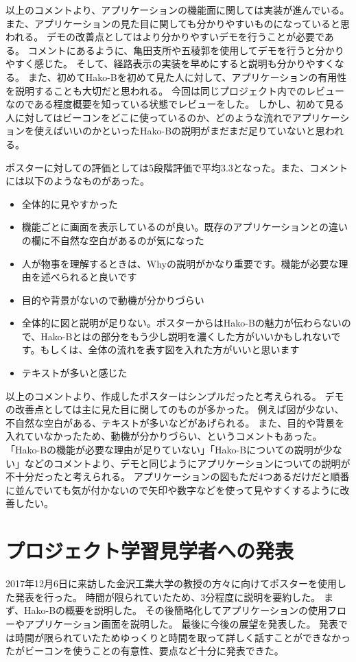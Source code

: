 \documentclass[openany,11pt,papersize]{jsbook}
\begin{document}
以上のコメントより、アプリケーションの機能面に関しては実装が進んでいる。
また、アプリケーションの見た目に関しても分かりやすいものになっていると思われる。
デモの改善点としてはより分かりやすいデモを行うことが必要である。
コメントにあるように、亀田支所や五稜郭を使用してデモを行うと分かりやすく感じた。
そして、経路表示の実装を早めにすると説明も分かりやすくなる。
また、初めてHako-Bを初めて見た人に対して、アプリケーションの有用性を説明することも大切だと思われる。
今回は同じプロジェクト内でのレビューなのである程度概要を知っている状態でレビューをした。
しかし、初めて見る人に対してはビーコンをどこに使っているのか、どのような流れでアプリケーションを使えばいいのかといったHako-Bの説明がまだまだ足りていないと思われる。

ポスターに対しての評価としては5段階評価で平均3.3となった。また、コメントには以下のようなものがあった。
\begin{itemize}

\item 全体的に見やすかった
\item 機能ごとに画面を表示しているのが良い。既存のアプリケーションとの違いの欄に不自然な空白があるのが気になった
\item 人が物事を理解するときは、Whyの説明がかなり重要です。機能が必要な理由を述べられると良いです
\item 目的や背景がないので動機が分かりづらい
\item 全体的に図と説明が足りない。ポスターからはHako-Bの魅力が伝わらないので、Hako-Bとはの部分をもう少し説明を濃くした方がいいかもしれないです。もしくは、全体の流れを表す図を入れた方がいいと思います
\item テキストが多いと感じた

\end{itemize}
以上のコメントより、作成したポスターはシンプルだったと考えられる。
デモの改善点としては主に見た目に関してのものが多かった。
例えば図が少ない、不自然な空白がある、テキストが多いなどがあげられる。
また、目的や背景を入れていなかったため、動機が分かりづらい、というコメントもあった。
「Hako-Bの機能が必要な理由が足りていない」「Hako-Bについての説明が少ない」などのコメントより、デモと同じようにアプリケーションについての説明が不十分だったと考えられる。
アプリケーションの図もただ4つあるだけだと順番に並んでいても気が付かないので矢印や数字などを使って見やすくするように改善したい。


\section{プロジェクト学習見学者への発表}
2017年12月6日に来訪した金沢工業大学の教授の方々に向けてポスターを使用した発表を行った。
時間が限られていたため、3分程度に説明を要約した。
まず、Hako-Bの概要を説明した。
その後簡略化してアプリケーションの使用フローやアプリケーション画面を説明した。
最後に今後の展望を発表した。
発表では時間が限られていたためゆっくりと時間を取って詳しく話すことができなかったがビーコンを使うことの有意性、要点など十分に発表できた。
\end{document}
